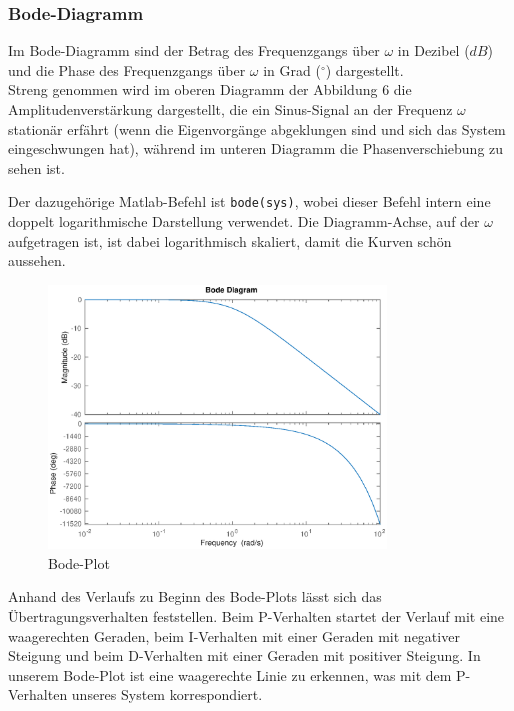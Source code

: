  
\subsubsection{Bode-Diagramm}
Im Bode-Diagramm sind der Betrag des Frequenzgangs über $\omega$ in Dezibel ($dB$) und die Phase des Frequenzgangs über $\omega$ in Grad ($^\circ$) dargestellt.\\
Streng genommen wird im oberen Diagramm der Abbildung 6 die Amplitudenverstärkung dargestellt, die ein Sinus-Signal an der Frequenz $\omega$ stationär erfährt (wenn die Eigenvorgänge abgeklungen sind und sich das System eingeschwungen hat), während im unteren Diagramm die Phasenverschiebung zu sehen ist.  

Der dazugehörige Matlab-Befehl ist \texttt{bode(sys)}, wobei dieser Befehl intern eine doppelt logarithmische Darstellung verwendet. Die Diagramm-Achse, auf der $\omega$ aufgetragen ist, ist dabei logarithmisch skaliert, damit die Kurven schön aussehen.

\begin{figure}[H]
    \label{fig:bodePlot}
    \label{fig:lassmich}
    \centering
    \includegraphics[width=0.8\textwidth]{Bilder/BodePT1Tt.eps}
    \caption{Bode-Plot}
 \end{figure}

 Anhand des Verlaufs zu Beginn des Bode-Plots lässt sich das Übertragungsverhalten feststellen. Beim P-Verhalten startet der Verlauf mit eine waagerechten Geraden, beim I-Verhalten mit einer Geraden mit negativer Steigung und beim D-Verhalten mit einer Geraden mit positiver Steigung. 
 In unserem Bode-Plot ist eine waagerechte Linie zu erkennen, was mit dem P-Verhalten unseres System korrespondiert.

